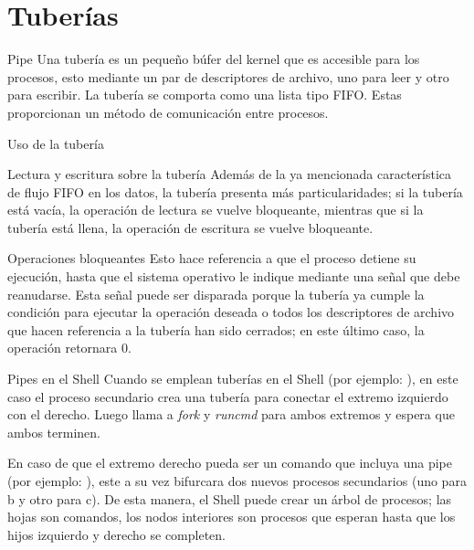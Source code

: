 \documentclass{libs/ufc_format}
\begin{document}
\section{Tuberías}
\begin{frame}{Pipe}
  Una tubería es un pequeño búfer del kernel que es accesible para los procesos, esto mediante un par de descriptores de archivo, uno para leer y otro para escribir. La tubería se comporta como una lista tipo FIFO. Estas proporcionan un método de comunicación entre procesos.
\end{frame}
\begin{frame}{Uso de la tubería}
  
\end{frame}
\begin{frame}{Lectura y escritura sobre la tubería}
  Además de la ya mencionada característica de flujo FIFO en los datos, la tubería presenta más particularidades; si la tubería está vacía, la operación de lectura se vuelve bloqueante, mientras que si la tubería está llena, la operación de escritura se vuelve bloqueante.

  \begin{block}{Operaciones bloqueantes}
    Esto hace referencia a que el proceso detiene su ejecución, hasta que el sistema operativo le indique mediante una señal que debe reanudarse.\newline \vspace{0.4cm} Esta señal puede ser disparada porque la tubería ya cumple la condición para ejecutar la operación deseada o todos los descriptores de archivo que hacen referencia a la tubería han sido cerrados; en este último caso, la operación retornara 0.
  \end{block}
\end{frame}
\begin{frame}{Pipes en el Shell}
  Cuando se emplean tuberías en el Shell (por ejemplo: ), en este caso el proceso secundario crea una tubería para conectar el extremo izquierdo con el derecho. Luego llama a \textit{fork} y \textit{runcmd} para ambos extremos y espera que ambos terminen.

  \vspace{0.3cm}

  En caso de que el extremo derecho pueda ser un comando que incluya una pipe (por ejemplo: ), este a su vez bifurcara dos nuevos procesos secundarios (uno para b y otro para c). De esta manera, el Shell puede crear un árbol de procesos; las hojas son comandos, los nodos interiores son procesos que esperan hasta que los hijos izquierdo y derecho se completen.
\end{frame}
\end{document}
